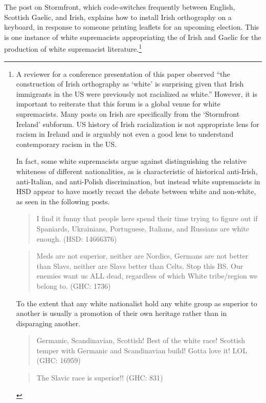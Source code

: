 \documentclass[output=paper,colorlinks,citecolor=brown]{langscibook}
\begin{document}
\noindent The post on Stormfront, which code-switches frequently between English, Scottish Gaelic, and Irish, explains how to install Irish orthography on a keyboard, in response to someone printing leaflets for an upcoming election. This is one instance of white supremacists appropriating the  of Irish and  Gaelic for the production of white supremacist literature.\footnote{A reviewer for a conference presentation of this paper observed ``the construction of Irish orthography as `white' is surprising given that Irish immigrants in the US were previously not racialized as white.'' However, it is important to reiterate that this forum is a global venue for white supremacists. Many posts on Irish are specifically from the `Stormfront Ireland' subforum. US history of Irish racialization is not appropriate lens for racism in Ireland and is arguably not even a good lens to understand contemporary racism in the US.

In fact, some white supremacists argue against distinguishing the relative whiteness of different nationalities, as is characteristic of historical anti-Irish, anti-Italian, and anti-Polish discrimination, but instead white supremacists in HSD appear to have mostly recast the debate between white and non-white, as seen in the following posts.

\begin{quote}
I find it funny that people here spend their time trying to figure out if Spaniards, Ukrainians, Portuguese, Italians, and Russians are white enough. (HSD: 14666376)
\end{quote}
\begin{quote}
Meds are not superior, neither are Nordics, Germans are not better than Slavs, neither are Slavs better than Celts. Stop this BS. Our enemies want us ALL dead, regardless of which White tribe\slash region we belong to. (GHC: 1736)
\end{quote}

\noindent To the extent that any white nationalist hold any white group as superior to another is usually a promotion of their own heritage rather than in disparaging another.

\begin{quote}
Germanic, Scandinavian, Scottish! Best of the white race! Scottish temper with Germanic and Scandinavian build! Gotta love it! LOL  (GHC: 16959)
\end{quote}
\begin{quote}
The Slavic race is superior!! (GHC: 831) 
\end{quote}}
\end{document}
